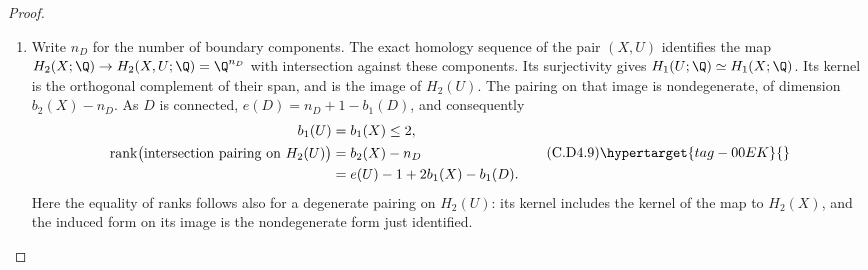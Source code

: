 \begin{proof}
\begin{enumerate}[label={$\langle1\rangle$\arabic*.},leftmargin=*]
\paragraph{Homology and the compact intersection pairing.}
The finite algebra in \eqref{cdp:eq:C.D4.6} and the K\"unneth formula give
$H^1(X_0,\OO_{X_0})=0$: the three summands on $E$ are
$\OO$, $\OO(-1,-1)$ and $\OO(-2,-2)$, all with $H^1=0$.
The resolution Leray sequence injects $H^1(X,\OO_X)$ into
$H^0(X_0,R^1\rho_*\OO_X)$, of dimension
$\sum p_g(X_0,p)$. Since $X$ is projective, \eqref{cdp:eq:C.D4.7} gives
\[
                         b_1(X;\Q)=2q(X)\le2.
\tag{C.D4.8}\hypertarget{tag-00EJ}{}\label{cdp:eq:C.D4.8}
\]
The irreducible components of $D$ have independent homology
classes. The exceptional classes have a negative-definite
intersection matrix. In the first case of \eqref{cdp:eq:C.D4.5} the
remaining class pushes forward to the nonzero class of $R$;
in the second, the two remaining classes push forward to
$(3,2)$ and $(0,1)$, which are independent on $E$.
Moreover their span contains the pullback of the ample
class $B=(3,3)$, whose square is positive. The Hodge index
theorem implies that the intersection form on this span is
nondegenerate: its part orthogonal to the positive pullback
class is negative definite.

\item Write $n_D$ for the number of boundary components. The exact
homology sequence of the pair $(X,U)$ identifies the map
$H_2(X;\Q)\to H_2(X,U;\Q)=\Q^{n_D}$ with intersection
against these components. Its surjectivity gives
$H_1(U;\Q)\simeq H_1(X;\Q)$. Its kernel is the orthogonal
complement of their span, and is the image of $H_2(U)$.
The pairing on that image is nondegenerate, of dimension
$b_2(X)-n_D$. As $D$ is connected,
$e(D)=n_D+1-b_1(D)$, and consequently
\[
\begin{split}
 b_1(U)&=b_1(X)\le2,\\
 \operatorname{rank}\bigl(\hbox{intersection pairing on }H_2(U)\bigr)
     &=b_2(X)-n_D\\
     &=e(U)-1+2b_1(X)-b_1(D).
\end{split}
\tag{C.D4.9}\hypertarget{tag-00EK}{}\label{cdp:eq:C.D4.9}
\]
Here the equality of ranks follows also for a degenerate
pairing on $H_2(U)$: its kernel includes the kernel of the
map to $H_2(X)$, and the induced form on its image is the
nondegenerate form just identified.


\end{enumerate}
\end{proof}
